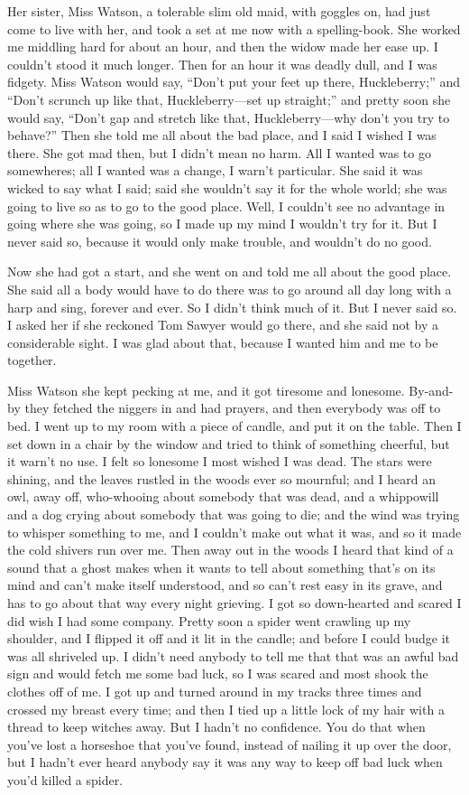 \documentclass[10pt,a4paper]{article}
\begin{document}
Her sister, Miss Watson, a tolerable slim old maid, with goggles on, had just come to live with her, and took a set at me now with a spelling-book. She worked me middling hard for about an hour, and then the widow made her ease up. I couldn’t stood it much longer. Then for an hour it was deadly dull, and I was fidgety. Miss Watson would say, “Don’t put your feet up there, Huckleberry;” and “Don’t scrunch up like that, Huckleberry—set up straight;” and pretty soon she would say, “Don’t gap and stretch like that, Huckleberry—why don’t you try to behave?” Then she told me all about the bad place, and I said I wished I was there. She got mad then, but I didn’t mean no harm. All I wanted was to go somewheres; all I wanted was a change, I warn’t particular. She said it was wicked to say what I said; said she wouldn’t say it for the whole world; she was going to live so as to go to the good place. Well, I couldn’t see no advantage in going where she was going, so I made up my mind I wouldn’t try for it. But I never said so, because it would only make trouble, and wouldn’t do no good.

Now she had got a start, and she went on and told me all about the good place. She said all a body would have to do there was to go around all day long with a harp and sing, forever and ever. So I didn’t think much of it. But I never said so. I asked her if she reckoned Tom Sawyer would go there, and she said not by a considerable sight. I was glad about that, because I wanted him and me to be together.

Miss Watson she kept pecking at me, and it got tiresome and lonesome. By-and-by they fetched the niggers in and had prayers, and then everybody was off to bed. I went up to my room with a piece of candle, and put it on the table. Then I set down in a chair by the window and tried to think of something cheerful, but it warn’t no use. I felt so lonesome I most wished I was dead. The stars were shining, and the leaves rustled in the woods ever so mournful; and I heard an owl, away off, who-whooing about somebody that was dead, and a whippowill and a dog crying about somebody that was going to die; and the wind was trying to whisper something to me, and I couldn’t make out what it was, and so it made the cold shivers run over me. Then away out in the woods I heard that kind of a sound that a ghost makes when it wants to tell about something that’s on its mind and can’t make itself understood, and so can’t rest easy in its grave, and has to go about that way every night grieving. I got so down-hearted and scared I did wish I had some company. Pretty soon a spider went crawling up my shoulder, and I flipped it off and it lit in the candle; and before I could budge it was all shriveled up. I didn’t need anybody to tell me that that was an awful bad sign and would fetch me some bad luck, so I was scared and most shook the clothes off of me. I got up and turned around in my tracks three times and crossed my breast every time; and then I tied up a little lock of my hair with a thread to keep witches away. But I hadn’t no confidence. You do that when you’ve lost a horseshoe that you’ve found, instead of nailing it up over the door, but I hadn’t ever heard anybody say it was any way to keep off bad luck when you’d killed a spider.
\end{document}
